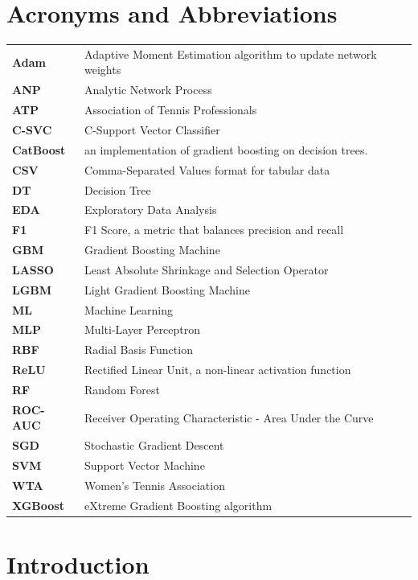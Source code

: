 \section*{Acronyms and Abbreviations}
\begin{tabular}{@{}l@{\hspace{2em}}l}
\textbf{Adam} & Adaptive Moment Estimation algorithm to update network weights \\
\textbf{ANP} & Analytic Network Process \\
\textbf{ATP} & Association of Tennis Professionals \\
\textbf{C-SVC} & C-Support Vector Classifier \\
\textbf{CatBoost} & an implementation of gradient boosting on decision trees. \\
\textbf{CSV} & Comma-Separated Values format for tabular data \\
\textbf{DT} & Decision Tree \\
\textbf{EDA} & Exploratory Data Analysis \\
\textbf{F1} & F1 Score, a metric that balances precision and recall \\
\textbf{GBM} & Gradient Boosting Machine \\
\textbf{LASSO} & Least Absolute Shrinkage and Selection Operator \\
\textbf{LGBM} & Light Gradient Boosting Machine \\
\textbf{ML} & Machine Learning \\
\textbf{MLP} & Multi-Layer Perceptron \\
\textbf{RBF} & Radial Basis Function \\
\textbf{ReLU} & Rectified Linear Unit, a non-linear activation function \\
\textbf{RF} & Random Forest \\
\textbf{ROC-AUC} & Receiver Operating Characteristic - Area Under the Curve \\
\textbf{SGD} & Stochastic Gradient Descent \\
\textbf{SVM} & Support Vector Machine \\
\textbf{WTA} & Women's Tennis Association \\
\textbf{XGBoost} & eXtreme Gradient Boosting algorithm \\
\end{tabular}


\pagebreak


\section{Introduction}

